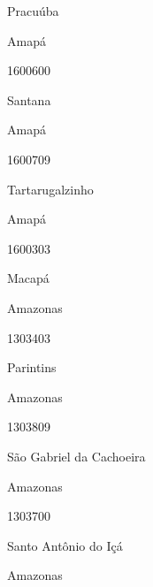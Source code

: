 \documentclass[
  letterpaper,
]{report}
\begin{document}
Pracuúba

\n    

\n    

\n      

Amapá

\n      

1600600

\n      

Santana

\n    

\n    

\n      

Amapá

\n      

1600709

\n      

Tartarugalzinho

\n    

\n    

\n      

Amapá

\n      

1600303

\n      

Macapá

\n    

\n    

\n      

Amazonas

\n      

1303403

\n      

Parintins

\n    

\n    

\n      

Amazonas

\n      

1303809

\n      

São Gabriel da Cachoeira

\n    

\n    

\n      

Amazonas

\n      

1303700

\n      

Santo Antônio do Içá

\n    

\n    

\n      

Amazonas
\end{document}
